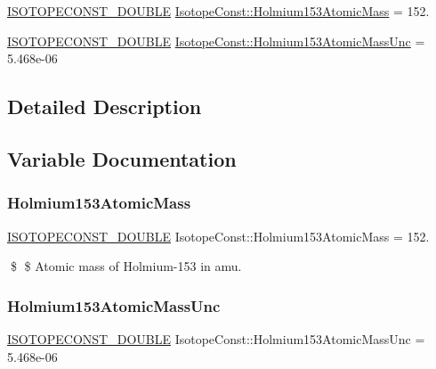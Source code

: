 \begin{DoxyCompactItemize}
\item 
\mbox{\hyperlink{group___isotope_const-_macros_ga8f45a7272ce02c0b4c65c44636ed719a}{I\+S\+O\+T\+O\+P\+E\+C\+O\+N\+S\+T\+\_\+\+D\+O\+U\+B\+LE}} \mbox{\hyperlink{group___isotope_const-_holmium-_ho153_ga0a1e9e1223872a2f92fde998adb9628f}{Isotope\+Const\+::\+Holmium153\+Atomic\+Mass}} = 152.
\item 
\mbox{\hyperlink{group___isotope_const-_macros_ga8f45a7272ce02c0b4c65c44636ed719a}{I\+S\+O\+T\+O\+P\+E\+C\+O\+N\+S\+T\+\_\+\+D\+O\+U\+B\+LE}} \mbox{\hyperlink{group___isotope_const-_holmium-_ho153_gae613a1c67d996665442d52da33751db0}{Isotope\+Const\+::\+Holmium153\+Atomic\+Mass\+Unc}} = 5.\+468e-\/06
\end{DoxyCompactItemize}


\subsection{Detailed Description}


\subsection{Variable Documentation}
\mbox{\label{group___isotope_const-_holmium-_ho153_ga0a1e9e1223872a2f92fde998adb9628f}} 
\subsubsection{\texorpdfstring{Holmium153\+Atomic\+Mass}{Holmium153AtomicMass}}
{\footnotesize\ttfamily \mbox{\hyperlink{group___isotope_const-_macros_ga8f45a7272ce02c0b4c65c44636ed719a}{I\+S\+O\+T\+O\+P\+E\+C\+O\+N\+S\+T\+\_\+\+D\+O\+U\+B\+LE}} Isotope\+Const\+::\+Holmium153\+Atomic\+Mass = 152.}

\$ \$ Atomic mass of Holmium-\/153 in amu. \mbox{\label{group___isotope_const-_holmium-_ho153_gae613a1c67d996665442d52da33751db0}} 
\subsubsection{\texorpdfstring{Holmium153\+Atomic\+Mass\+Unc}{Holmium153AtomicMassUnc}}
{\footnotesize\ttfamily \mbox{\hyperlink{group___isotope_const-_macros_ga8f45a7272ce02c0b4c65c44636ed719a}{I\+S\+O\+T\+O\+P\+E\+C\+O\+N\+S\+T\+\_\+\+D\+O\+U\+B\+LE}} Isotope\+Const\+::\+Holmium153\+Atomic\+Mass\+Unc = 5.\+468e-\/06}

